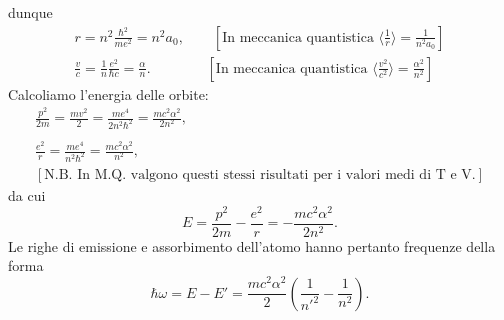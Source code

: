 dunque
\begin{eqnarray}
&r=n^2\frac{\hbar^2}{me^2}=n^2a_0, \qquad \left[\textrm{In meccanica quantistica } \langle \frac{1}{r}\rangle =\frac{1}{n^2 a_0}\right]& \\
&\frac{v}{c}=\frac{1}{n}\frac{e^2}{\hbar c}=\frac{\alpha}{n}. \qquad \qquad \left[\textrm{In meccanica quantistica } \langle \frac{v^2}{c^2}\rangle =\frac{\alpha ^2}{n^2}\right]&
\end{eqnarray}
Calcoliamo l'energia delle orbite:
\begin{eqnarray}
&\displaystyle{\frac{p^2}{2m}=\frac{mv^2}{2}=\frac{me^4}{2n^2\hbar ^2}=\frac{mc^2 \alpha ^2}{2n^2}} ,& \\
\nonumber \\
&\displaystyle{\frac{e^2}{r}=\frac{me^4}{n^2\hbar ^2}=\frac{mc^2 \alpha ^2}{n^2}} ,&\\
& \left[\textrm{N.B. In M.Q. valgono questi stessi risultati per i valori medi di T e V.}\right]& \nonumber
\end{eqnarray}
da cui
\begin{equation}
E=\frac{p^2}{2m}-\frac{e^2}{r}=-\frac{mc^2\alpha ^2}{2n^2}.
\end{equation}
Le righe di emissione e assorbimento dell'atomo hanno pertanto frequenze della forma
\begin{equation}
\hbar \omega =E-E' = \frac{mc^2\alpha ^2}{2} \left( \frac{1}{n'^2}-\frac{1}{n^2}\right).
\end{equation}
